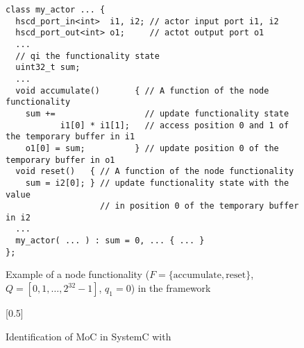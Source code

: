 \begin{figure}[h]
\centering
\begin{verbatim}
class my_actor ... {
  hscd_port_in<int>  i1, i2; // actor input port i1, i2
  hscd_port_out<int> o1;     // actot output port o1
  ...
  // qi the functionality state
  uint32_t sum;
  ...
  void accumulate()       { // A function of the node functionality
    sum +=                  // update functionality state
           i1[0] * i1[1];   // access position 0 and 1 of the temporary buffer in i1
    o1[0] = sum;          } // update position 0 of the temporary buffer in o1
  void reset()   { // A function of the node functionality
    sum = i2[0]; } // update functionality state with the value
                   // in position 0 of the temporary buffer in i2
  ...
  my_actor( ... ) : sum = 0, ... { ... }
};
\end{verbatim}
\caption{Example of a node functionality
($F = \{\textrm{accumulate}, \textrm{reset}\}$, $Q= [0,1,\ldots,2^{32}-1]$, $q_1 = 0$)
in the \SysteMoC{} framework}\label{example-node-functionality}
\end{figure}

\begin{figure}[h]
\centering
\scalebox{0.5}[0.5]{}
\caption{Identification of MoC in SystemC with \SysteMoC}
\label{fig:ng-moc-identification}
\end{figure}

%

